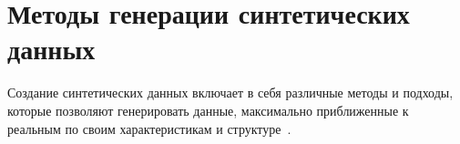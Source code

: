 





\section{Методы генерации синтетических данных}

Создание синтетических данных включает в себя различные методы и подходы, которые позволяют генерировать данные, максимально приближенные к реальным по своим характеристикам и структуре~\cite{gan}.



